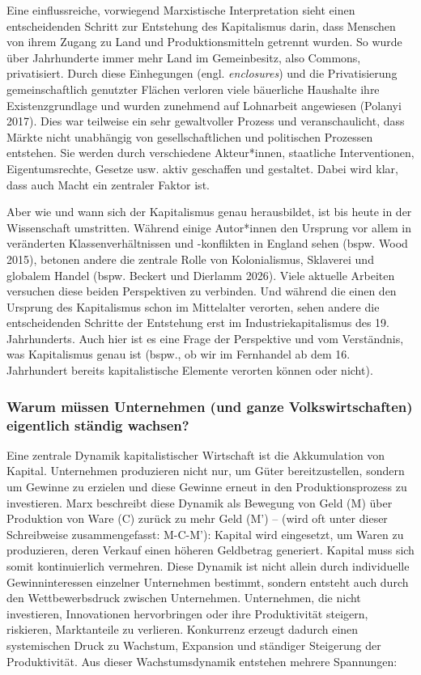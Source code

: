 \documentclass[
  nswissgerman,
  a4paper,
  DIV=11,
  numbers=noendperiod,
  oneside,
  openany]{scrreprt}
\begin{document}
Eine einflussreiche, vorwiegend Marxistische Interpretation sieht einen
entscheidenden Schritt zur Entstehung des Kapitalismus darin, dass
Menschen von ihrem Zugang zu Land und Produktionsmitteln getrennt
wurden. So wurde über Jahrhunderte immer mehr Land im Gemeinbesitz, also
Commons, privatisiert. Durch diese Einhegungen (engl. \emph{enclosures})
und die Privatisierung gemeinschaftlich genutzter Flächen verloren viele
bäuerliche Haushalte ihre Existenzgrundlage und wurden zunehmend auf
Lohnarbeit angewiesen (Polanyi 2017). Dies war teilweise ein sehr
gewaltvoller Prozess und veranschaulicht, dass Märkte nicht unabhängig
von gesellschaftlichen und politischen Prozessen entstehen. Sie werden
durch verschiedene Akteur*innen, staatliche Interventionen,
Eigentumsrechte, Gesetze usw. aktiv geschaffen und gestaltet. Dabei wird
klar, dass auch Macht ein zentraler Faktor ist.

Aber wie und wann sich der Kapitalismus genau herausbildet, ist bis
heute in der Wissenschaft umstritten. Während einige Autor*innen den
Ursprung vor allem in veränderten Klassenverhältnissen und -konflikten
in England sehen (bspw. Wood 2015), betonen andere die zentrale Rolle
von Kolonialismus, Sklaverei und globalem Handel (bspw. Beckert und
Dierlamm 2026). Viele aktuelle Arbeiten versuchen diese beiden
Perspektiven zu verbinden. Und während die einen den Ursprung des
Kapitalismus schon im Mittelalter verorten, sehen andere die
entscheidenden Schritte der Entstehung erst im Industriekapitalismus des
19. Jahrhunderts. Auch hier ist es eine Frage der Perspektive und vom
Verständnis, was Kapitalismus genau ist (bspw., ob wir im Fernhandel ab
dem 16. Jahrhundert bereits kapitalistische Elemente verorten können
oder nicht).

\subsubsection{Warum müssen Unternehmen (und ganze Volkswirtschaften)
eigentlich ständig
wachsen?}\label{warum-muxfcssen-unternehmen-und-ganze-volkswirtschaften-eigentlich-stuxe4ndig-wachsen}

Eine zentrale Dynamik kapitalistischer Wirtschaft ist die Akkumulation
von Kapital. Unternehmen produzieren nicht nur, um Güter
bereitzustellen, sondern um Gewinne zu erzielen und diese Gewinne erneut
in den Produktionsprozess zu investieren. Marx beschreibt diese Dynamik
als Bewegung von Geld (M) über Produktion von Ware (C) zurück zu mehr
Geld (M') -- (wird oft unter dieser Schreibweise zusammengefasst:
M-C-M'): Kapital wird eingesetzt, um Waren zu produzieren, deren Verkauf
einen höheren Geldbetrag generiert. Kapital muss sich somit
kontinuierlich vermehren. Diese Dynamik ist nicht allein durch
individuelle Gewinninteressen einzelner Unternehmen bestimmt, sondern
entsteht auch durch den Wettbewerbsdruck zwischen Unternehmen.
Unternehmen, die nicht investieren, Innovationen hervorbringen oder ihre
Produktivität steigern, riskieren, Marktanteile zu verlieren. Konkurrenz
erzeugt dadurch einen systemischen Druck zu Wachstum, Expansion und
ständiger Steigerung der Produktivität. Aus dieser Wachstumsdynamik
entstehen mehrere Spannungen:
\end{document}
